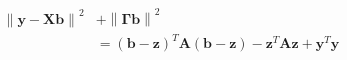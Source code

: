 \documentclass[10pt]{article}
\begin{document}
\begin{align*}\begin{split}
\left\lVert \boldsymbol y - \boldsymbol{X} \boldsymbol{b} \right \rVert^2 &+ \left\lVert \boldsymbol{\Gamma} \boldsymbol{b} \right \rVert^2 \\
\phantom{x} &= 
\left( \boldsymbol b - \boldsymbol z \right)^T \boldsymbol A \left( \boldsymbol b - \boldsymbol z \right) -
\boldsymbol z^T \boldsymbol A \boldsymbol z + \boldsymbol y^T \boldsymbol y
\end{split}\end{align*}
\end{document}
